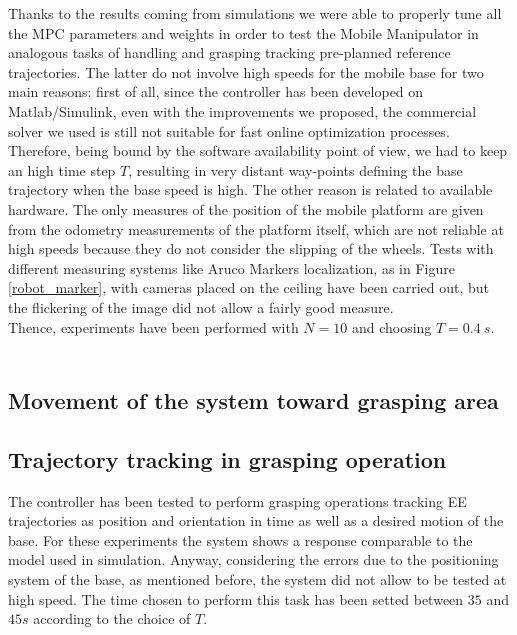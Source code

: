 Thanks to the results coming from simulations we were able to properly tune all the MPC parameters and weights in order to test the Mobile Manipulator in analogous tasks of handling and grasping tracking pre-planned reference trajectories. The latter do not involve high speeds for the mobile base for two main reasons: first of all, since the controller has been developed on Matlab/Simulink, even with the improvements we proposed, the commercial solver we used is still not suitable for fast online optimization processes. Therefore, being bound by the software availability point of view, we had to keep an high time step $T$, resulting in very distant way-points defining the base trajectory when the base speed is high. The other reason is related to available hardware.
The only measures of the position of the mobile platform are given from the odometry measurements of the platform itself, which are not reliable at high speeds because they do not consider the slipping of the wheels. Tests with different measuring systems like Aruco Markers localization, as in Figure \ref{robot_marker}, with cameras placed on the ceiling have been carried out, but the flickering of the image did not allow a fairly good measure.\\
Thence, experiments have been performed with $N=10$ and choosing $T=0.4\ s$.
\\\\
\subsection{Movement of the system toward grasping area}
\subsection{Trajectory tracking in grasping operation}

The controller has been tested to perform grasping operations tracking EE trajectories as position and orientation in time as well as a desired motion of the base. For these experiments the system shows a response comparable to the model used in simulation. Anyway, considering the errors due to the positioning system of the base, as mentioned before, the system did not allow to be tested at high speed. The time chosen to perform this task has been setted between $35$ and $45 s$ according to the choice of $T$. 

